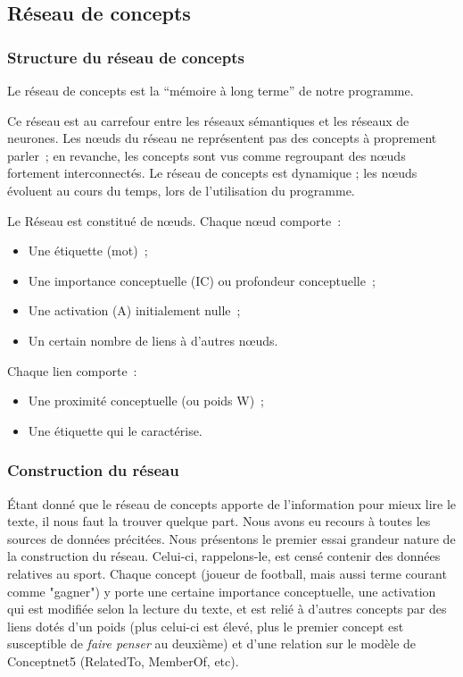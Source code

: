 \documentclass[a4paper, 12pt]{article}
\begin{document}
\subsection{Réseau de concepts}

\subsubsection{Structure du réseau de concepts}

\begin{definition}
Le réseau de concepts est la ``mémoire à long terme'' de notre programme.

Ce réseau est au carrefour entre les réseaux sémantiques et les réseaux de neurones. Les n\oe{}uds du réseau ne représentent pas des concepts à proprement parler~; en revanche, les concepts sont vus comme regroupant des n\oe{}uds fortement interconnectés. Le réseau de concepts est dynamique ; les nœuds évoluent au cours du temps, lors de l'utilisation du programme.
\end{definition}


Le Réseau est constitué de n\oe{}uds. Chaque n\oe{}ud comporte~:
\begin{itemize}
  \item Une étiquette (mot)~;
 \item Une importance conceptuelle (IC) ou profondeur conceptuelle~;
 \item Une activation (A) initialement nulle~;
 \item Un certain nombre de liens à d'autres n\oe{}uds.
\end{itemize}

Chaque lien comporte~:
\begin{itemize}
 \item Une proximité conceptuelle (ou poids W)~;
 \item Une étiquette qui le caractérise.
\end{itemize}


\subsubsection{Construction du réseau}

Étant donné que le réseau de concepts apporte de l'information pour mieux lire le texte, il nous faut la trouver quelque part. Nous avons eu recours à toutes les sources de données précitées. Nous présentons le premier essai grandeur nature de la construction du réseau. Celui-ci, rappelons-le, est censé contenir des données relatives au sport. Chaque concept (joueur de football, mais aussi terme courant comme "gagner") y porte une certaine importance conceptuelle, une activation qui est modifiée selon la lecture du texte, et est relié à d'autres concepts par des liens dotés d'un poids (plus celui-ci est élevé, plus le premier concept est susceptible de \textit{faire penser} au deuxième) et d'une relation sur le modèle de Conceptnet5 (RelatedTo, MemberOf, etc).
\end{document}

